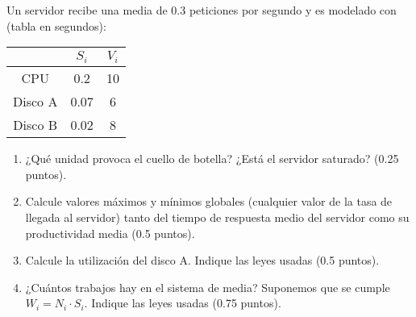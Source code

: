 \documentclass[12pt]{article}
\begin{document}
    \begin{ejercicio}[2 puntos]
        Un servidor recibe una media de $0.3$ peticiones por segundo y es modelado con (tabla en segundos):
        \begin{table}[H]
        \centering
        \begin{tabular}{c|c|c}
            & $S_i$ & $V_i$ \\
            \hline
            CPU & 0.2 & 10 \\
            Disco A & 0.07 & 6 \\
            Disco B & 0.02 & 8
        \end{tabular}
        \end{table}

        \begin{enumerate}
            \item ¿Qué unidad provoca el cuello de botella? ¿Está el servidor saturado? (0.25 puntos).
            \item Calcule valores máximos y mínimos globales (cualquier valor de la tasa de llegada al servidor) tanto del tiempo de respuesta medio del servidor como su productividad media (0.5 puntos).
            \item Calcule la utilización del disco A. Indique las leyes usadas (0.5 puntos).
            \item ¿Cuántos trabajos hay en el sistema de media? Suponemos que se cumple $W_i = N_i\cdot S_i$. Indique las leyes usadas (0.75 puntos).
        \end{enumerate}
    \end{ejercicio}
\end{document}
